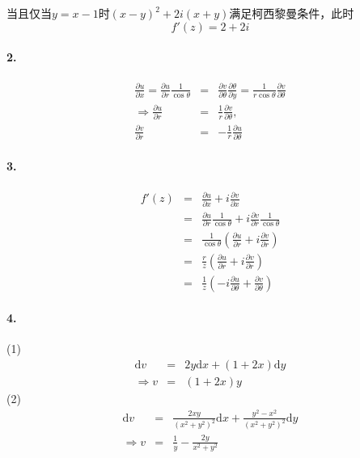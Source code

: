 \documentclass[UTF8]{ctexart}
\newcommand{\mathd}{\mathrm{d}}
\begin{document}
当且仅当$y = x - 1$时$(x - y)^2 + 2 i (x +
y)$满足柯西黎曼条件，此时
\[ f' (z) = 2 + 2 i \]

\paragraph{2.}

\begin{eqnarray*}
  \frac{\partial u}{\partial x} = \frac{\partial u}{\partial r} \frac{1}{\cos
  \theta} & = & \frac{\partial v}{\partial \theta} \frac{\partial
  \theta}{\partial y} = \frac{1}{r \cos \theta} \frac{\partial v}{\partial
  \theta}\\
  \Rightarrow \frac{\partial u}{\partial r} & = & \frac{1}{r} \frac{\partial
  v}{\partial \theta},\\
  \frac{\partial v}{\partial r} & = & - \frac{1}{r} \frac{\partial u}{\partial
  \theta}
\end{eqnarray*}

\paragraph{3.}

\begin{eqnarray*}
  f' (z) & = & \frac{\partial u}{\partial x} + i \frac{\partial v}{\partial
  x}\\
  & = & \frac{\partial u}{\partial r} \frac{1}{\cos \theta} + i
  \frac{\partial v}{\partial r} \frac{1}{\cos \theta}\\
  & = & \frac{1}{\cos \theta} \left( \frac{\partial u}{\partial r} + i
  \frac{\partial v}{\partial r} \right)\\
  & = & \frac{r}{z} \left( \frac{\partial u}{\partial r} + i \frac{\partial
  v}{\partial r} \right)\\
  & = & \frac{1}{z} \left( - i \frac{\partial u}{\partial \theta} +
  \frac{\partial v}{\partial \theta} \right)
\end{eqnarray*}

\paragraph{4.}

(1)
\begin{eqnarray*}
  \mathd v & = & 2 y \mathd x + (1 + 2 x) \mathd y\\
  \Rightarrow v & = & (1 + 2 x) y
\end{eqnarray*}
(2)
\begin{eqnarray*}
  \mathd v & = & \frac{2 xy}{(x^2 + y^2)^2} \mathd x + \frac{y^2 - x^2}{(x^2 +
  y^2)^2} \mathd y\\
  \Rightarrow v & = & \frac{1}{y} - \frac{2 y}{x^2 + y^2}
\end{eqnarray*}
\end{document}
